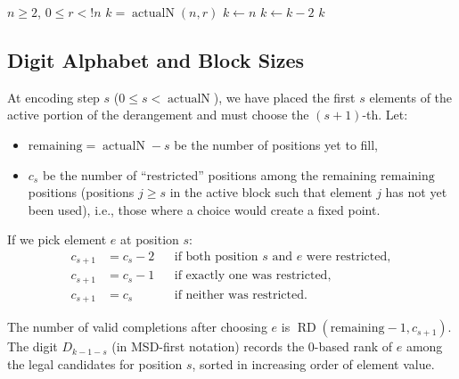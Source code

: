 \documentclass[11pt,a4paper]{article}
\newcommand{\subfact}[1]{!{#1}} %
\newcommand{\rder}[2]{\operatorname{RD}(#1,#2)} %
\newcommand{\actualN}{\operatorname{actualN}}
\begin{document}
    \begin{algorithm}[h]
\caption{Computing $\actualN(n,r)$ (matching Java \texttt{smallestN})}
\label{alg:actualN}
\begin{algorithmic}[1]
    \Require $n \geq 2$, $0 \leq r < \subfact{n}$
    \Ensure $k = \actualN(n,r)$
    \State $k \gets n$
    \While{$k > 2$ \textbf{and} $\subfact{k-2} > r$}
        \State $k \gets k - 2$ 
    \EndWhile
    \State \Return $k$
\end{algorithmic}
    \end{algorithm}

    \subsection{Digit Alphabet and Block Sizes}

    At encoding step $s$ ($0 \leq s < \actualN$), we have placed the first $s$
    elements of the active portion of the derangement and must choose the
    $(s+1)$-th. Let:
    \begin{itemize}
        \item $\text{remaining} = \actualN - s$ be the number of positions yet to fill,
        \item $c_s$ be the number of ``restricted'' positions among the remaining
        $\text{remaining}$ positions (positions $j \geq s$ in the active
        block such that element $j$ has not yet been used), i.e., those
        where a choice would create a fixed point.
    \end{itemize}

    If we pick element $e$ at position $s$:
    \begin{align*}
        c_{s+1} &= c_s - 2 && \text{if both position $s$ and $e$ were restricted},\\
        c_{s+1} &= c_s - 1 && \text{if exactly one was restricted},\\
        c_{s+1} &= c_s     && \text{if neither was restricted}.
    \end{align*}

    The number of valid completions after choosing $e$ is
    $\rder{\text{remaining}-1}{c_{s+1}}$. The digit $D_{k-1-s}$ (in
    MSD-first notation) records the 0-based rank of $e$ among the legal
    candidates for position $s$, sorted in increasing order of element value.
\end{document}
